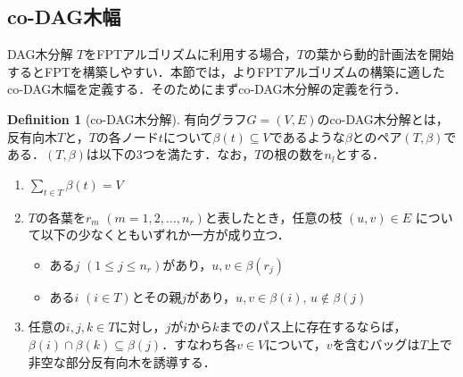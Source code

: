 \documentclass[master]{kuisthesis}		%
\theoremstyle{plain}
\theoremstyle{definition}
\newtheorem{definition*}{Definition}
\begin{document}
\subsection{co-DAG木幅}
DAG木分解 $T$をFPTアルゴリズムに利用する場合，$T$の葉から動的計画法を開始するとFPTを構築しやすい．本節では，よりFPTアルゴリズムの構築に適したco-DAG木幅を定義する．そのためにまずco-DAG木分解の定義を行う．


\begin{definition*}[co-DAG木分解]
 有向グラフ$G=(V, E)$のco-DAG木分解とは，反有向木$T$と，$T$の各ノード$t$について$\beta(t) \subseteq V$であるような$\beta$とのペア$(T, \beta)$である．$(T, \beta)$は以下の3つを満たす．なお，$T$の根の数を$n_l$とする．
 
\begin{enumerate}
    \item $\sum_{t\in T} \beta(t) = V$ 
    \item $T$の各葉を$r_m$ $(m = 1, 2, \dots, n_r)$と表したとき，任意の枝 $ (u, v) \in E $ について以下の少なくともいずれか一方が成り立つ．
    \begin{itemize}
          \item ある$j$ $(1 \leq j \leq n_r)$があり，$u, v \in \beta(r_j)$
          \item ある$i$ $(i \in T)$とその親$j$があり，$u, v \in \beta(i)$, $u \notin \beta(j)$
    \end{itemize}
    \item 任意の$ i, j, k \in T$に対し，$j$が$i$から$k$までのパス上に存在するならば，$\beta(i) \cap \beta(k) \subseteq \beta(j)$．すなわち各$v \in V$について，$v$を含むバッグは$T$上で非空な部分反有向木を誘導する．
    \end{enumerate}
\end{definition*}

\end{document}
